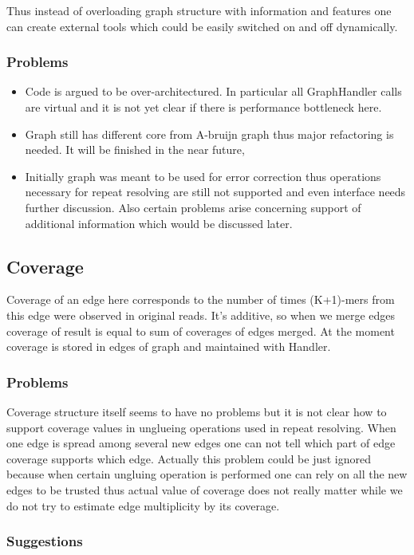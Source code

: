 \documentclass[12pt]{article}
\begin{document}
 Thus instead of overloading graph structure with information and features one can create external tools which could be easily switched on and off dynamically.

\subsubsection{Problems}
\begin{itemize}
\item Code is argued to be over-architectured. In particular all GraphHandler calls are virtual and it is not yet clear if there is performance bottleneck here.
\item Graph still has different core from A-bruijn graph thus major refactoring is needed. It will be finished in the near future,
\item Initially graph was meant to be used for error correction thus operations necessary for repeat resolving are still not supported and even interface needs further discussion. Also certain problems arise concerning support of additional information which would be discussed later.
\end{itemize}

\subsection{Coverage}

Coverage of an edge here corresponds to the number of times (K+1)-mers from this edge were observed in original reads. It's additive, so when we merge edges coverage of result is equal to sum of coverages of edges merged. At the moment coverage is stored in edges of graph and maintained with Handler.

\subsubsection{Problems}

Coverage structure itself seems to have no problems but it is not clear how to support coverage values in unglueing operations used in repeat resolving. When one edge is spread among several new edges one can not tell which part of edge coverage supports which edge. Actually this problem could be just ignored because when certain ungluing operation is performed one can rely on all the new edges to be trusted thus actual value of coverage does not really matter while we do not try to estimate edge multiplicity by its coverage.

\subsubsection{Suggestions}
\end{document}
